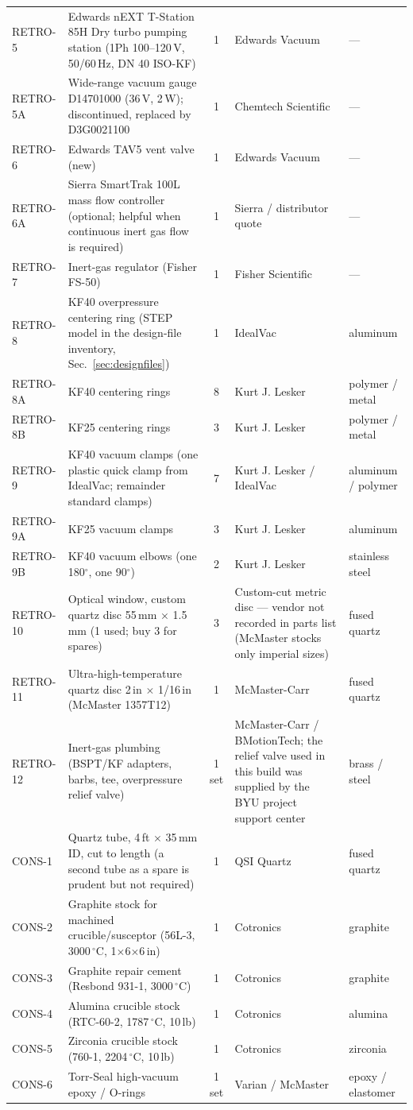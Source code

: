 \documentclass[10pt,letterpaper]{article}
\newcommand{\dC}{\,$^{\circ}$C}
\begin{document}
{\begin{longtable}{lL{7.0cm}cL{4.4cm}L{1.6cm}}
RETRO-5 & Edwards nEXT T-Station 85H Dry turbo pumping station (1Ph 100--120\,V, 50/60\,Hz, DN 40 ISO-KF) & 1 & Edwards Vacuum & --- \\
RETRO-5A & Wide-range vacuum gauge D14701000 (36\,V, 2\,W); discontinued, replaced by D3G0021100 & 1 & Chemtech Scientific & --- \\
RETRO-6 & Edwards TAV5 vent valve (new) & 1 & Edwards Vacuum & --- \\
RETRO-6A & Sierra SmartTrak 100L mass flow controller (optional; helpful when continuous inert gas flow is required) & 1 & Sierra / distributor quote & --- \\
RETRO-7 & Inert-gas regulator (Fisher FS-50) & 1 & Fisher Scientific & --- \\
RETRO-8 & KF40 overpressure centering ring (STEP model in the design-file inventory, Sec.~\ref{sec:designfiles}) & 1 & IdealVac & aluminum \\
RETRO-8A & KF40 centering rings & 8 & Kurt J. Lesker & polymer / metal \\
RETRO-8B & KF25 centering rings & 3 & Kurt J. Lesker & polymer / metal \\
RETRO-9 & KF40 vacuum clamps (one plastic quick clamp from IdealVac; remainder standard clamps) & 7 & Kurt J. Lesker / IdealVac & aluminum / polymer \\
RETRO-9A & KF25 vacuum clamps & 3 & Kurt J. Lesker & aluminum \\
RETRO-9B & KF40 vacuum elbows (one 180$^{\circ}$, one 90$^{\circ}$) & 2 & Kurt J. Lesker & stainless steel \\
RETRO-10 & Optical window, custom quartz disc 55\,mm $\times$ 1.5\,mm (1 used; buy 3 for spares) & 3 & Custom-cut metric disc --- vendor not recorded in parts list (McMaster stocks only imperial sizes) & fused quartz \\
RETRO-11 & Ultra-high-temperature quartz disc 2\,in $\times$ 1/16\,in (McMaster 1357T12) & 1 & McMaster-Carr & fused quartz \\
RETRO-12 & Inert-gas plumbing (BSPT/KF adapters, barbs, tee, overpressure relief valve) & 1 set & McMaster-Carr / BMotionTech; the relief valve used in this build was supplied by the BYU project support center & brass / steel \\
CONS-1 & Quartz tube, 4\,ft $\times$ 35\,mm ID, cut to length (a second tube as a spare is prudent but not required) & 1 & QSI Quartz & fused quartz \\
CONS-2 & Graphite stock for machined crucible/susceptor (56L-3, 3000\dC, 1$\times$6$\times$6\,in) & 1 & Cotronics & graphite \\
CONS-3 & Graphite repair cement (Resbond 931-1, 3000\dC) & 1 & Cotronics & graphite \\
CONS-4 & Alumina crucible stock (RTC-60-2, 1787\dC, 10\,lb) & 1 & Cotronics & alumina \\
CONS-5 & Zirconia crucible stock (760-1, 2204\dC, 10\,lb) & 1 & Cotronics & zirconia \\
CONS-6 & Torr-Seal high-vacuum epoxy / O-rings & 1 set & Varian / McMaster & epoxy / elastomer \\
\end{longtable}
}
\end{document}
